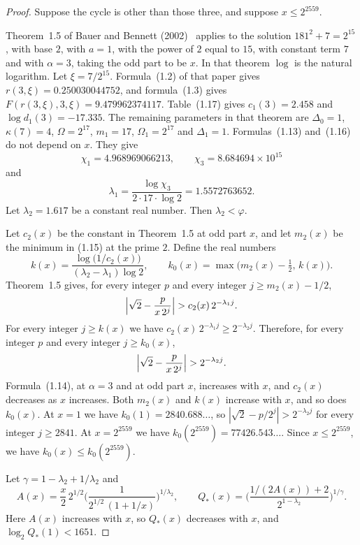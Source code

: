 \documentclass[11pt]{article}
\begin{document}
\begin{proof}
Suppose the cycle is other than those three, and suppose $x \le 2^{2559}$.

Theorem~1.5 of Bauer and Bennett (2002)~\cite{bauer-bennett-2002} applies to the solution $181^2 + 7 = 2^{15}$, with base $2$, with $a = 1$, with the power of $2$ equal to $15$, with constant term $7$ and with $\alpha = 3$, taking the odd part to be $x$.
In that theorem $\log$ is the natural logarithm.
Let $\xi = 7/2^{15}$.
Formula~(1.2) of that paper gives $r(3, \xi) = 0.250030044752$, and formula~(1.3) gives $F(r(3, \xi), 3, \xi) = 9.479962374117$.
Table~(1.17) gives $c_1(3) = 2.458$ and $\log d_1(3) = -17.335$.
The remaining parameters in that theorem are $\Delta_0 = 1$, $\kappa(7) = 4$, $\Omega = 2^{17}$, $m_1 = 17$, $\Omega_1 = 2^{17}$ and $\Delta_1 = 1$.
Formulas~(1.13) and~(1.16) do not depend on $x$.
They give
\[
\chi_1 = 4.968969066213, \qquad \chi_3 = 8.684694 \times 10^{15}
\]
and
\[
\lambda_1 = \frac{\log \chi_3}{2 \cdot 17 \cdot \log 2} = 1.5572763652.
\]
Let $\lambda_2 = 1.617$ be a constant real number.
Then $\lambda_2 < \varphi$.

Let $c_2(x)$ be the constant in Theorem~1.5 at odd part $x$, and let $m_2(x)$ be the minimum in (1.15) at the prime $2$.
Define the real numbers
\[
k(x) = \frac{\log\bigl(1/c_2(x)\bigr)}{(\lambda_2 - \lambda_1)\log 2}, \qquad k_0(x) = \max\bigl(m_2(x) - \tfrac12,\, k(x)\bigr).
\]
Theorem~1.5 gives, for every integer $p$ and every integer $j \ge m_2(x) - 1/2$,
\[
\Bigl| \sqrt{2} - \frac{p}{x\, 2^{j}} \Bigr| > c_2(x)\, 2^{-\lambda_1 j}.
\]
For every integer $j \ge k(x)$ we have $c_2(x)\, 2^{-\lambda_1 j} \ge 2^{-\lambda_2 j}$.
Therefore, for every integer $p$ and every integer $j \ge k_0(x)$,
\[
\Bigl| \sqrt{2} - \frac{p}{x\, 2^{j}} \Bigr| > 2^{-\lambda_2 j}.
\]
Formula~(1.14), at $\alpha = 3$ and at odd part $x$, increases with $x$, and $c_2(x)$ decreases as $x$ increases.
Both $m_2(x)$ and $k(x)$ increase with $x$, and so does $k_0(x)$.
At $x = 1$ we have $k_0(1) = 2840.688\ldots$, so $|\sqrt{2} - p/2^{j}| > 2^{-\lambda_2 j}$ for every integer $j \ge 2841$.
At $x = 2^{2559}$ we have $k_0(2^{2559}) = 77426.543\ldots$.
Since $x \le 2^{2559}$, we have $k_0(x) \le k_0(2^{2559})$.

Let $\gamma = 1 - \lambda_2 + 1/\lambda_2$ and
\[
A(x) = \frac{x}{2}\, 2^{1/2}
\Biggl( \frac{1}{2^{1/2}\,(1+1/x)} \Biggr)^{1/\lambda_2},
\qquad
Q_*(x) = \Biggl( \frac{1/(2A(x)) + 2}{2^{1-\lambda_2}} \Biggr)^{1/\gamma}.
\]
Here $A(x)$ increases with $x$, so $Q_*(x)$ decreases with $x$, and $\log_2 Q_*(1) < 1651$.


\end{proof}
\end{document}
